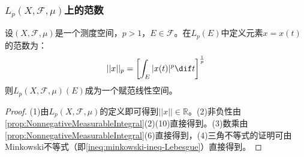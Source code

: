 \subsubsection{$L_p(X,\mathscr{F},\mu)$上的范数}
\begin{definition}
	设$(X,\mathscr{F},\mu)$是一个测度空间，$p>1$，$E\in\mathscr{F}$。在$L_p(E)$中定义元素$x=x(t)$的范数为：
	\begin{equation*}
		||x||_p=\left[\int_{E}^{}|x(t)|^p\dif t\right]^\frac{1}{p}
	\end{equation*}
	则$L_p(X,\mathscr{F},\mu)(E)$成为一个赋范线性空间。
\end{definition}
\begin{proof}
	(1)由$L_p(X,\mathscr{F},\mu)$的定义即可得到$||x||\in\mathbb{R}$。(2)非负性由\cref{prop:NonnegativeMeasurableIntegral}(2)(10)直接得到。(3)数乘由\cref{prop:NonnegativeMeasurableIntegral}(6)直接得到，(4)三角不等式的证明可由Minkowski不等式（即\cref{ineq:minkowski-ineq-Lebesgue}）直接得到。
\end{proof}

